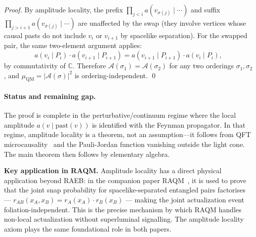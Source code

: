 \documentclass[11pt,a4paper]{article}
\theoremstyle{plain}
\theoremstyle{definition}
\theoremstyle{remark}
\newcommand{\muC}{\mu_{\mathrm{QM}}}   %
\begin{document}
\begin{description}
\begin{proof}
  By amplitude locality, the prefix $\prod_{j<i} a(v_{\sigma(j)} \mid \cdots)$
  and suffix $\prod_{j>i+1} a(v_{\sigma(j)} \mid \cdots)$ are unaffected by the
  swap (they involve vertices whose causal pasts do not include $v_i$ or
  $v_{i+1}$ by spacelike separation). For the swapped pair, the same two-element
  argument applies:
  \begin{equation}
    a(v_i \mid P_i) \cdot a(v_{i+1} \mid P_{i+1})
    = a(v_{i+1} \mid P_{i+1}) \cdot a(v_i \mid P_i),
  \end{equation}
  by commutativity of $\mathbb{C}$. Therefore $\mathcal{A}(\sigma_1) =
  \mathcal{A}(\sigma_2)$ for any two orderings $\sigma_1, \sigma_2$, and
  $\muC = |\mathcal{A}(\sigma)|^2$ is ordering-independent. \qed
  \end{proof}

  \paragraph{Status and remaining gap.}
  The proof is complete in the perturbative/continuum regime where the local
  amplitude $a(v \mid \mathrm{past}(v))$ is identified with the Feynman
  propagator. In that regime, amplitude locality is a theorem, not an
  assumption---it follows from QFT microcausality~\citep{Haag1996} and the
  Pauli-Jordan function vanishing outside the light cone. The main theorem
  then follows by elementary algebra.

  \textbf{Key application in RAQM.}
  Amplitude locality has a direct physical application beyond RAEB: in the
  companion paper RAQM~\citep{Sandeman2026RAQM}, it is used to prove that
  the joint snap probability for spacelike-separated entangled pairs
  factorises --- $r_{AB}(x_A, x_B) = r_A(x_A) \cdot r_B(x_B)$ --- making
  the joint actualization event foliation-independent.
  This is the precise mechanism by which RAQM handles non-local actualization
  without superluminal signalling. The amplitude locality axiom plays the
  same foundational role in both papers.


\end{description}
\end{document}
